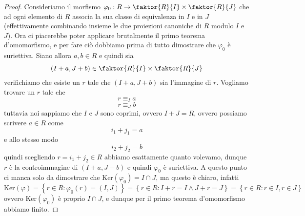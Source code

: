 \documentclass[11pt]{scrartcl}
\renewcommand{\ker}[1]{\text{Ker}\!\left(#1\right)}
\begin{document}
	\begin{proof}
		Consideriamo il morfismo $\varphi_0:R\to \faktor{R}{I}\times \faktor{R}{J}$ che ad ogni elemento di $R$ associa la sua classe di equivalenza in $I$ e in $J$ (effettivamente combinando insieme le due proiezioni canoniche di $R$ modulo $I$ e $J$). Ora ci piacerebbe poter applicare brutalmente il primo teorema d'omomorfismo, e per fare ciò dobbiamo prima di tutto dimostrare che $\varphi_0$ è suriettiva. Siano allora $a,b\in R$ e quindi sia
		$$(I+a,J+b)\in \faktor{R}{I}\times\faktor{R}{J}$$
		verifichiamo che esiste un $r$ tale che $(I+a,J+b)$ sia l'immagine di $r$. Vogliamo trovare un $r$ tale che 
		$$r\equiv_I a$$
		$$r\equiv_J b$$
		tuttavia noi sappiamo che $I$ e $J$ sono coprimi, ovvero $I+J=R$, ovvero possiamo scrivere $a\in R$ come 
		$$i_1+j_1=a$$
		e allo stesso modo
		$$i_2+j_2=b$$
		quindi scegliendo $r=i_1+j_2\in R$ abbiamo esattamente quanto volevamo, dunque $r$ è la controimmagine di $(I+a,J+b)$ e quindi $\varphi_0$ è suriettiva. A questo punto ci manca solo da dimostrare che $\ker{\varphi_0}=I\cap J$, ma questo è chiaro, infatti
		$$\ker{\varphi}=\left\{r\in R:\varphi_0(r)=(I,J)\right\}=\left\{r\in R: I+r=I \land J+r=J\right\}=\left\{r\in R:r\in I,r\in J\right\}$$
		ovvero $\ker{\varphi_0}$ è proprio $I\cap J$, e dunque per il primo teorema d'omomorfismo abbiamo finito.
	\end{proof}
\end{document}
